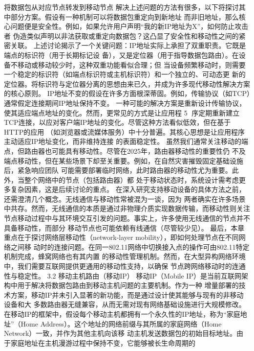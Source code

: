               将数据包从对应节点转发到移动节点
解决上述问题的方法有很多，以下将探讨其中部分方案。假设有一种机制可以将数据包重定向到新地址
而非旧地址，那么核心问题便是安全性。例如，如果允许用户声明“我的新IP地址为X”，如何防止攻击者
伪造类似声明以非法获取或重定向数据包？这凸显了安全性和移动性之间的紧密关联。
上述讨论揭示了一个关键问题：IP地址实际上承担了双重职责。它既是端点的标识符（用于长期标记设
备），又是定位器（用于指导数据包路由）。在设备不移动或移动较少时，这种双重功能看似合理；但
当设备频繁移动时，则需要一个稳定的标识符（如端点标识符或主机标识符）和一个独立的、可动态更
新的定位器。将标识符与定位器分离的思想由来已久，并成为许多现代移动性解决方案的核心原则。
IP地址不变的假设在许多方面根深蒂固。例如，传输协议（如TCP）通常假定连接期间IP地址保持不变。
一种可能的解决方案是重新设计传输协议，使其适应端点地址的变化。然而，更常见的方式是让应用程
                                                 5
序定期重新建立TCP连接，以应对客户端IP地址的变化。尽管这种方法看似低效，但在基于HTTP的应用
（如浏览器或流媒体服务）中十分普遍。其核心思想是让应用程序主动适应IP地址变化，而非维持连接
的表面稳定性。
虽然我们通常关注移动的端点，但路由器也可能具有移动性。尽管在2025年，路由器移动性的重要性仍
不及端点移动性，但在某些场景下却至关重要。例如，在自然灾害摧毁固定基础设施后，紧急响应团队
可能需要部署临时网络，此时路由器的移动性尤为重要。此外，当整个网络中的节点（包括路由器）都
处于移动状态时，系统设计需考虑更多复杂因素，这是后续讨论的重点。
在深入研究支持移动设备的具体方法之前，还需澄清几个概念。无线通信与移动性常被混为一谈，因为
两者确实在许多场景中共存。然而，无线通信的本质是通过非物理介质实现数据传输，而移动性则关注
节点移动过程中与其环境交互引发的问题。事实上，许多使用无线通信的节点并不具备移动性，而部分
移动节点也可能依赖有线通信（尽管较少见）。
最后，本章重点在于探讨网络层移动性（network-layer mobility），即如何处理节点在不同网络之间移
动时的连接问题。在同一802.11网络中切换接入点的操作可由802.11特定机制完成，蜂窝网络也有其内置
的移动性管理机制。然而，在大型异构网络环境中，我们需要互联网提供更通用的移动性支持，以确保
节点跨网络移动时的连通性与稳定性。
3.2 移动主机路由（移动IP）
移动IP（Mobile IP）是当前互联网架构中用于解决将数据包路由到移动主机问题的主要机制。作为一种
增量部署的技术方案，移动IP并未引入显著的新功能，而是通过设计使其能够与现有的非移动设备和大
多数路由器无缝兼容，从而无需对现有网络基础设施进行大规模修改。
在移动IP的框架中，假设每个移动主机都拥有一个永久性的IP地址，称为“家庭地址”（Home
Address）。这个地址的网络前缀与其所属的家庭网络（Home Network）一致，并作为其他主机向该移
动主机发送数据包的初始目标地址。由于家庭地址在主机漫游过程中保持不变，它能够被长生命周期的
